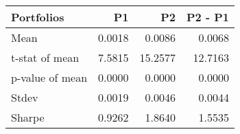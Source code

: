 \begin{tabular}{lrrr}
\toprule
Portfolios & P1 & P2 & P2 - P1 \\
\midrule
Mean & 0.0018 & 0.0086 & 0.0068 \\
t-stat of mean & 7.5815 & 15.2577 & 12.7163 \\
p-value of mean & 0.0000 & 0.0000 & 0.0000 \\
Stdev & 0.0019 & 0.0046 & 0.0044 \\
Sharpe & 0.9262 & 1.8640 & 1.5535 \\
\bottomrule
\end{tabular}
